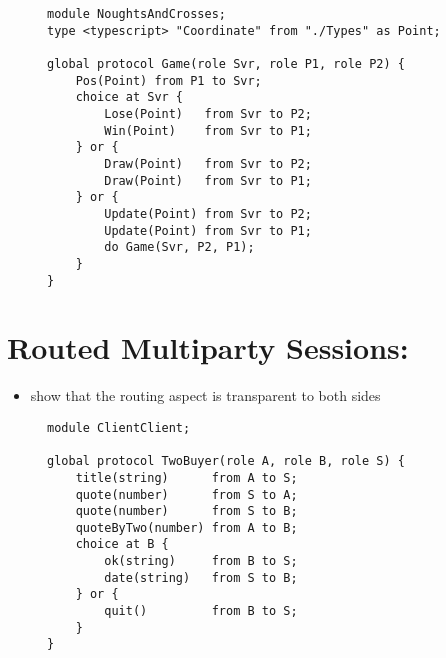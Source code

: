 \begin{figure}[!ht]
\begin{lstlisting}[language=Scribble, tabsize=2]
module NoughtsAndCrosses;
type <typescript> "Coordinate" from "./Types" as Point;

global protocol Game(role Svr, role P1, role P2) {
	Pos(Point) from P1 to Svr;
	choice at Svr {
		Lose(Point)   from Svr to P2;
		Win(Point)    from Svr to P1;
	} or {
		Draw(Point)   from Svr to P2;
		Draw(Point)   from Svr to P1;
	} or {
		Update(Point) from Svr to P2;
		Update(Point) from Svr to P1;
		do Game(Svr, P2, P1);
	}
}
\end{lstlisting}
\label{lst:game}
\end{figure}

\section{Routed Multiparty Sessions: }
\begin{itemize}
\item show that the routing aspect is transparent to both sides
\end{itemize}

\begin{figure}[!ht]
\begin{lstlisting}[language=Scribble, tabsize=2]
module ClientClient;

global protocol TwoBuyer(role A, role B, role S) {
	title(string)      from A to S;
	quote(number)      from S to A;
	quote(number)      from S to B;
	quoteByTwo(number) from A to B;
	choice at B {
		ok(string)     from B to S;
		date(string)   from S to B;
	} or {
		quit()         from B to S;
	}
}
\end{lstlisting}
\label{lst:twobuyer}
\end{figure}

